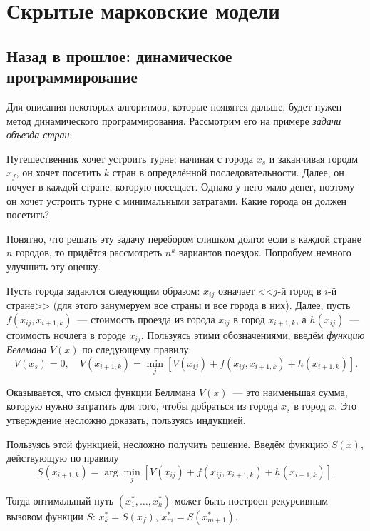 \section{Скрытые марковские модели}

\subsection{Назад в прошлое: динамическое программирование}
Для описания некоторых алгоритмов, которые появятся дальше, будет нужен метод 
динамического программирования. Рассмотрим его на примере \emph{задачи объезда 
стран}:
\begin{problem}
	Путешественник хочет устроить турне: начиная с города \(x_{s}\) и 
	заканчивая городм \(x_{f}\), он хочет посетить \(k\) стран в определённой 
	последовательности. Далее, он ночует в каждой стране, которую посещает. 
	Однако у него мало денег, поэтому он хочет устроить турне с минимальными 
	затратами. Какие города он должен посетить?
\end{problem}
Понятно, что решать эту задачу перебором слишком долго: если в каждой стране 
\(n\) городов, то придётся рассмотреть \(n^{k}\) вариантов поездок. Попробуем 
немного улучшить эту оценку.

Пусть города задаются следующим образом: \(x_{ij}\) означает <<\(j\)-й город в 
\(i\)-й стране>> (для этого занумеруем все страны и все города в них). Далее, 
пусть \(f(x_{ij}, x_{i + 1, k})\)~--- стоимость проезда из города \(x_{ij}\) в 
город \(x_{i + 1, k}\), а \(h(x_{ij})\)~--- стоимость ночлега в городе 
\(x_{ij}\). Пользуясь этими обозначениями, введём \emph{функцию Беллмана} 
\(V(x)\) по следующему правилу: 
\[
	V(x_{s}) = 0, \quad V(x_{i + 1, k}) = \min\limits_{j}\left[V(x_{ij}) + 
	f(x_{ij}, x_{i + 1, k}) + h(x_{i + 1, k})\right].
\]

Оказывается, что смысл функции Беллмана \(V(x)\)~--- это наименьшая сумма, 
которую нужно затратить для того, чтобы добраться из города \(x_{s}\) в город 
\(x\). Это утверждение несложно доказать, пользуясь индукцией.

Пользуясь этой функцией, несложно получить решение. Введём функцию \(S(x)\), 
действующую по правилу
\[
	S(x_{i + 1, k}) = \arg\min\limits_{j}\left[V(x_{ij}) + f(x_{ij}, x_{i + 1, 
	k}) + h(x_{i + 1, k})\right].
\]

Тогда оптимальный путь \((x_{1}^{*}, \ldots, x_{k}^{*})\) может быть построен 
рекурсивным вызовом функции \(S\): \(x_{k}^{*} = S(x_{f})\), \(x_{m}^{*} = 
S(x_{m + 1}^{*})\). %


